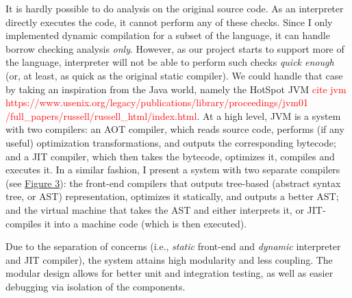 It is hardly possible to do analysis on the original source code. As an
interpreter directly executes the code, it cannot perform any of these checks.
Since I only implemented dynamic compilation for a subset of the language, it
can handle borrow checking analysis \textit{only}. However, as our project
starts to support more of the language, interpreter will not be able to perform
such checks \textit{quick enough} (or, at least, as quick as the original
static compiler).  We could handle that case by taking an inspiration from the
Java world, namely the HotSpot JVM \textcolor{red}{cite jvm
https://www.usenix.org/legacy/publications/library/proceedings/jvm01
/full\_papers/russell/russell\_html/index.html}. At a high level, JVM is a
system with two compilers: an AOT compiler, which reads source code, performs
(if any useful) optimization transformations, and outputs the corresponding
bytecode; and a JIT compiler, which then takes the bytecode, optimizes it,
compiles and executes it. In a similar fashion, I present a system with two
separate compilers (see \hyperref[arch1]{Figure 3}): the front-end compilers
that outputs tree-based (abstract syntax tree, or AST) representation,
optimizes it statically, and outputs a better AST; and the virtual machine that
takes the AST and either interprets it, or JIT-compiles it into a machine code
(which is then executed).

Due to the separation of concerns (i.e., \textit{static} front-end 
and \textit{dynamic} interpreter and JIT compiler), the system attains
high modularity and less coupling. The modular design
allows for better unit and integration testing, as well as
easier debugging via isolation of the components.

